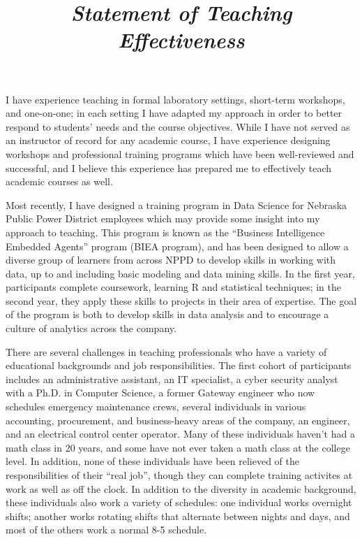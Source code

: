 \documentclass[12pt, letterpaper, sans]{moderncv}
\title{\emph{Statement of Teaching Effectiveness}}
\begin{document}
\makecvtitle
\setlength{\parindent}{15pt} %

I have experience teaching in formal laboratory settings, short-term workshops, and one-on-one; in each setting I have adapted my approach in order to better respond to students' needs and the course objectives. While I have not served as an instructor of record for any academic course, I have experience designing workshops and professional training programs which have been well-reviewed and successful, and I believe this experience has prepared me to effectively teach academic courses as well. 

\vspace{.5cm}\hspace{8pt} 
Most recently, I have designed a training program in Data Science for Nebraska Public Power District employees which may provide some insight into my approach to teaching. This program is known as the ``Business Intelligence Embedded Agents'' program (BIEA program), and has been designed to allow a diverse group of learners from across NPPD to develop skills in working with data, up to and including basic modeling and data mining skills. In the first year, participants complete coursework, learning R and statistical techniques; in the second year, they apply these skills to projects in their area of expertise. The goal of the program is both to develop skills in data analysis and to encourage a culture of analytics across the company.  

There are several challenges in teaching professionals who have a variety of educational backgrounds and job responsibilities. The first cohort of participants includes an administrative assistant, an IT specialist, a cyber security analyst with a Ph.D. in Computer Science, a former Gateway engineer who now schedules emergency maintenance crews, several individuals in various accounting, procurement, and business-heavy areas of the company, an engineer, and an electrical control center operator. Many of these individuals haven't had a math class in 20 years, and some have not ever taken a math class at the college level. In addition, none of these individuals have been relieved of the responsibilities of their ``real job'', though they can complete training activites at work as well as off the clock. In addition to the diversity in academic background, these individuals also work a variety of schedules: one individual works overnight shifts; another works rotating shifts that alternate between nights and days, and most of the others work a normal 8-5 schedule. 
\end{document}
